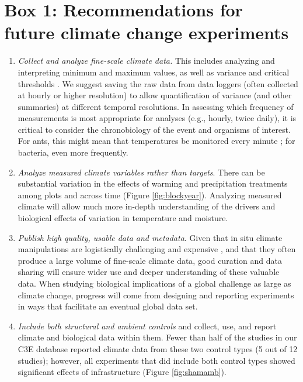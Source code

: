 \documentclass{article}
\begin{document}
\section* {Box 1: Recommendations for future climate change experiments} 
\begin{enumerate}
\item\textit{Collect and analyze fine-scale climate data.} This includes analyzing and interpreting minimum and maximum values, as well as variance and critical thresholds \citep[e.g., the number and duration of freeze-thaw events and accumulated chilling hours,][]{mcdaniel2014,vasseur2014}. We suggest saving the raw data from data loggers (often collected at hourly or higher resolution) to allow quantification of variance (and other summaries) at different temporal resolutions. In assessing which frequency of measurements is most appropriate for analyses (e.g., hourly, twice daily), it is critical to consider the chronobiology of the event and organisms of interest. For ants, this might mean that temperatures be monitored every minute \citep{shavit2017}; for bacteria, even more frequently. 
\item\textit{Analyze measured climate variables rather than targets}. There can be substantial variation in the effects of warming and precipitation treatments among plots and across time (Figure \ref{fig:blockyear}). Analyzing measured climate will allow much more in-depth understanding of the drivers and biological effects of variation in temperature and moisture.
\item\textit{Publish high quality, usable data and metadata}. Given that in situ climate manipulations are logistically challenging and expensive \citep{aronson2009}, and that they often produce a large volume of fine-scale climate data, good curation and data sharing will ensure wider use and deeper understanding of these valuable data. When studying biological implications of a global challenge as large as climate change, progress will come from designing and reporting experiments in ways that facilitate an eventual global data set. %
\item\textit{Include both structural and ambient controls} and collect, use, and report climate and biological data within them. Fewer than half of the studies in our C3E database reported climate data from these two control types (5 out of 12 studies); however, all experiments that did include both control types showed significant effects of infrastructure (Figure \ref{fig:shamamb}). %

\end{enumerate}
\end{document}
